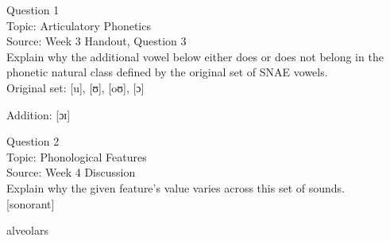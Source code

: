 \documentclass[12pt]{article}
\begin{document}
\begin{center}
\textbf{{\color{violet}{\HUGE 20201014 Wednesday\\}}}

\textbf{{\color{violet}{\HUGE ALL EXAMS\\}}}

\end{center}
\newpage

\begin{center}
\textbf{{\color{blue}{\HUGE START OF EXAM\\}}}

\textbf{{\color{blue}{\HUGE Student ID: 44715\\}}}

\textbf{{\color{blue}{\HUGE 4:00\\}}}

\end{center}
\newpage

{\large Question 1}\\

Topic: Articulatory Phonetics\\
Source: Week 3 Handout, Question 3\\

Explain why the additional vowel below either does or does not belong in the phonetic natural class defined by the original set of SNAE vowels.\\

Original set: {[u]}, {[ʊ]}, {[oʊ]}, {[ɔ]}

Addition: {[ɔɪ]}


\newpage

{\large Question 2}\\

Topic: Phonological Features\\
Source: Week 4 Discussion\\

Explain why the given feature's value varies across this set of sounds.\\

{[sonorant]}

alveolars


\newpage

\begin{center}
\textbf{{\color{red}{\HUGE END OF EXAM}}}\\

\end{center}
\newpage

\begin{center}
\textbf{{\color{blue}{\HUGE START OF EXAM\\}}}

\textbf{{\color{blue}{\HUGE Student ID: 34548\\}}}

\textbf{{\color{blue}{\HUGE 4:10\\}}}

\end{center}
\newpage
\end{document}
